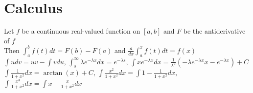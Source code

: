 \documentclass{article}
\begin{document}
\section{Calculus}
Let $f$ be a continuous real-valued function on $[a, b]$ and $F$ be the antiderivative of $f$ \\
Then $\int_a^b f(t) dt = F(b) - F(a)$ and $\frac{d}{dx}\int_a^x f(t)dt = f(x)$ \\
$\int udv = uv - \int vdu$, $\int_{s}^{\infty}\lambda e^{-\lambda x}dx = e^{-\lambda s}$, $\int xe^{-\lambda x}dx = \frac{1}{\lambda^2}(-\lambda e^{-\lambda x}x -e^{-\lambda x}) + C$ \\
$\int \frac{1}{1+x^2}dx = \arctan(x) + C$, $\int \frac{x^2}{1+x^2} dx = \int 1 - \frac{1}{1+x^2}dx$, $\int \frac{x^3}{1+x^2} dx = \int x - \frac{x}{1+x^2}dx$ 
\end{document}
